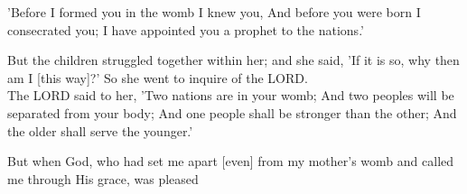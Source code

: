 \vspace{4\baselineskip}

\begin{scripture}[Jeremiah 1:5]
    'Before I formed you in the womb I knew you, And before you were born I consecrated you; I have appointed you a prophet to the nations.'
\end{scripture}

\vspace{4\baselineskip}

\begin{scripture}[Genesis 25:22-23]
    But the children struggled together within her; and she said, 'If it is so, why then am I [this way]?' So she went to inquire of the LORD.\\
    The LORD said to her, 'Two nations are in your womb; And two peoples will be separated from your body; And one people shall be stronger than the other; And the older shall serve the younger.'
\end{scripture}

\vspace{4\baselineskip}

\begin{scripture}[Galatians 1:15]
    But when God, who had set me apart [even] from my mother's womb and called me through His grace, was pleased
\end{scripture}

\vspace{4\baselineskip}


\vspace{10\baselineskip}
